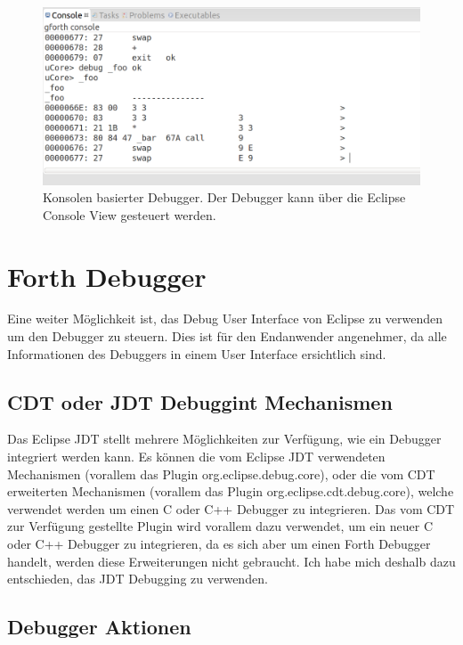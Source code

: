 \begin{figure}[H]
	\centering
		\includegraphics[scale=0.35]{debugger/consoledebugger.png}
		\caption{Konsolen basierter Debugger. Der Debugger kann über die Eclipse Console View gesteuert werden.}
		\label{fig:consoledebugger}
\end{figure}

\section{Forth Debugger}

Eine weiter Möglichkeit ist, das Debug User Interface von Eclipse zu verwenden um den Debugger zu steuern. Dies ist für den Endanwender angenehmer, da alle Informationen des Debuggers in einem User Interface ersichtlich sind.

\subsection{CDT oder JDT Debuggint Mechanismen}

Das Eclipse JDT stellt  mehrere Möglichkeiten zur Verfügung, wie ein Debugger integriert werden kann. Es können die vom Eclipse JDT verwendeten Mechanismen (vorallem das Plugin org.eclipse.debug.core), oder die vom CDT erweiterten Mechanismen (vorallem das Plugin org.eclipse.cdt.debug.core), welche verwendet werden um einen C oder C++ Debugger zu integrieren. Das vom CDT zur Verfügung gestellte Plugin wird vorallem dazu verwendet, um ein neuer C oder C++ Debugger zu integrieren, da es sich aber um einen Forth Debugger handelt, werden diese Erweiterungen nicht gebraucht. Ich habe mich deshalb dazu entschieden, das JDT Debugging zu verwenden.

\subsection{Debugger Aktionen}

